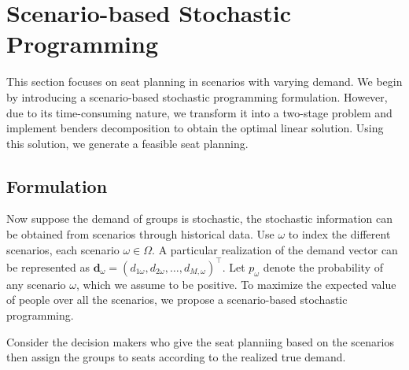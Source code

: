 
\section{Scenario-based Stochastic Programming}
This section focuses on seat planning in scenarios with varying demand. We begin by introducing a scenario-based stochastic programming formulation. However, due to its time-consuming nature, we transform it into a two-stage problem and implement benders decomposition to obtain the optimal linear solution. Using this solution, we generate a feasible seat planning.

\subsection{Formulation}

Now suppose the demand of groups is stochastic, the stochastic information can be obtained from scenarios through historical data. Use $\omega$ to index the different scenarios, each scenario $\omega \in \Omega$. A particular realization of the demand vector can be represented as $\mathbf{d}_\omega = (d_{1\omega},d_{2\omega},\ldots,d_{M,\omega})^{\intercal}$. Let $p_{\omega}$ denote the probability of any scenario $\omega$, which we assume to be positive. To maximize the expected value of people over all the scenarios, we propose a scenario-based stochastic programming.


Consider the decision makers who give the seat planniing based on the scenarios then assign the groups to seats according to the realized true demand. 


